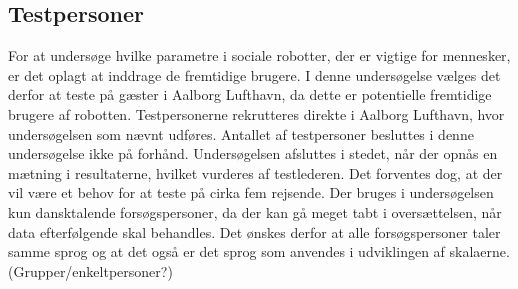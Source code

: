 \subsection{Testpersoner}
\label{ParametreTestpersoner}
%
For at undersøge hvilke parametre i sociale robotter, der er vigtige for mennesker, er det oplagt at inddrage de fremtidige brugere. I denne undersøgelse vælges det derfor at teste på gæster i Aalborg Lufthavn, da dette er potentielle fremtidige brugere af robotten. Testpersonerne rekrutteres direkte i Aalborg Lufthavn, hvor undersøgelsen som nævnt udføres. Antallet af testpersoner besluttes i denne undersøgelse ikke på forhånd. Undersøgelsen afsluttes i stedet, når der opnås en mætning i resultaterne, hvilket vurderes af testlederen. Det forventes dog, at der vil være et behov for at teste på cirka fem rejsende. Der bruges i undersøgelsen kun dansktalende forsøgspersoner, da der kan gå meget tabt i oversættelsen, når data efterfølgende skal behandles. Det ønskes derfor at alle forsøgspersoner taler samme sprog og at det også er det sprog som anvendes i udviklingen af skalaerne. (Grupper/enkeltpersoner?)